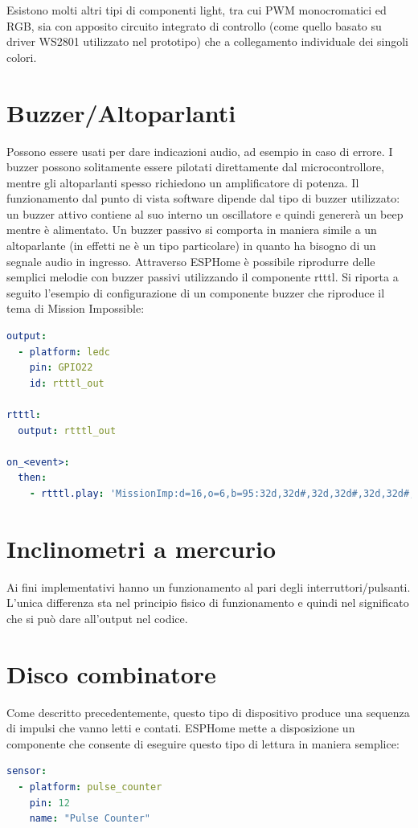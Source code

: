 \documentclass[12pt,a4paper]{report}
\begin{document}
Esistono molti altri tipi di componenti light, tra cui PWM monocromatici ed RGB, sia con apposito circuito integrato di controllo (come
quello basato su driver WS2801 utilizzato nel prototipo) che a collegamento individuale dei singoli colori.



\section{Buzzer/Altoparlanti}
Possono essere usati per dare indicazioni audio, ad esempio in caso di errore. I buzzer possono solitamente essere pilotati direttamente
dal microcontrollore, mentre gli altoparlanti spesso richiedono un amplificatore di potenza.
Il funzionamento dal punto di vista software dipende dal tipo di buzzer utilizzato: un buzzer attivo contiene al suo interno un oscillatore
e quindi genererà un beep mentre è alimentato. Un buzzer passivo si comporta in maniera simile a un altoparlante (in effetti ne è un tipo
particolare) in quanto ha bisogno di un segnale audio in ingresso.
Attraverso ESPHome è possibile riprodurre delle semplici melodie con buzzer passivi utilizzando il componente rtttl. Si riporta a seguito
l'esempio di configurazione di un componente buzzer che riproduce il tema di Mission Impossible\cite{esphomeio}:
\begin{lstlisting}[language=yaml]
output:
  - platform: ledc
    pin: GPIO22
    id: rtttl_out

rtttl:
  output: rtttl_out

on_<event>:
  then:
    - rtttl.play: 'MissionImp:d=16,o=6,b=95:32d,32d#,32d,32d#,32d,32d#,32d,32d#,32d,32d,32d#,32e,32f,32f#,32g,g,8p,g,8p,a#,p,c7,p,g,8p,g,8p,f,p,f#,p,g,8p,g,8p,a#,p,c7,p,g,8p,g,8p,f,p,f#,p,a#,g,2d,32p,a#,g,2c#,32p,a#,g,2c,a#5,8c,2p,32p,a#5,g5,2f#,32p,a#5,g5,2f,32p,a#5,g5,2e,d#,8d'
\end{lstlisting}
\section{Inclinometri a mercurio}
Ai fini implementativi hanno un funzionamento al pari degli interruttori/pulsanti. L'unica differenza sta nel principio fisico di funzionamento
e quindi nel significato che si può dare all'output nel codice.

\section{Disco combinatore}
Come descritto precedentemente, questo tipo di dispositivo produce una sequenza di impulsi che vanno letti e contati. ESPHome mette
a disposizione un componente che consente di eseguire questo tipo di lettura in maniera semplice:
\begin{lstlisting}[language=yaml]
sensor:
  - platform: pulse_counter
    pin: 12
    name: "Pulse Counter"
\end{lstlisting}
\end{document}
